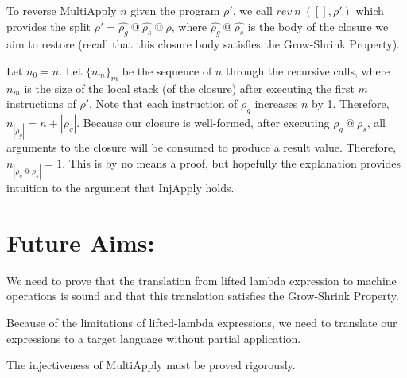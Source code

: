 \documentclass[11pt]{article}
\begin{document}
\break{}

To reverse MultiApply $n$ given the program $\rho'$, we call $rev\ n\ ([], \rho')$ which provides the split $\rho' = \hat{\rho_g}\ @ \ \hat{\rho_s}\ @\ \rho$, where $\hat{\rho_g}\ @\ \hat{\rho_s}$ is the body of the closure we aim to restore (recall that this closure body satisfies the Grow-Shrink Property). 

Let $n_0 = n$. Let ${\{n_m\}}_m$ be the sequence of $n$ through the recursive calls, where $n_m$ is the size of the local stack (of the closure) after executing the first $m$ instructions of $\rho'$. Note that each instruction of $\rho_g$ increases $n$ by 1. Therefore, $n_{|\rho_g|} = n + |\rho_g|$. Because our closure is well-formed, after executing $\rho_g\ @\ \rho_s$, all arguments to the closure will be consumed to produce a result value. Therefore, $n_{|\rho_g\ @\ \rho_s|} = 1$. This is by no means a proof, but
hopefully the explanation provides intuition to the argument that InjApply holds.

\section*{Future Aims:}

We need to prove that the translation from lifted lambda expression to machine operations is sound and that this translation satisfies the Grow-Shrink Property.

Because of the limitations of lifted-lambda expressions, we need to translate our expressions to a target language without partial application.

The injectiveness of MultiApply must be proved rigorously. 
\end{document}
